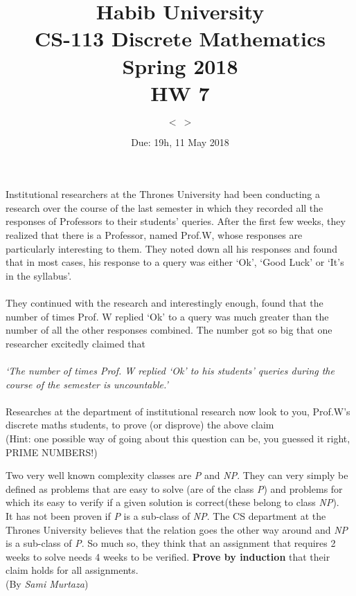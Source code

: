 \documentclass[addpoints]{exam}
\title{Habib University\\CS-113 Discrete Mathematics\\Spring 2018\\HW 7}
\author{$< \ >$}  %
\date{Due: 19h, 11 May 2018}
\begin{document}
\maketitle
\begin{questions}



\question
Institutional researchers at the Thrones University had been conducting a research over the course of the last semester in which they recorded all the responses of Professors to their students' queries. After the first few weeks, they realized that there is a Professor, named Prof.W, whose responses are particularly interesting to them. They noted down all his responses and found that in most cases, his response to a query was either `Ok', `Good Luck' or `It's in the syllabus'. \\ \\
They continued with the research and interestingly enough, found that the number of times Prof. W replied `Ok' to a query was much greater than the number of all the other responses combined. The number got so big that one researcher excitedly claimed that \\ \\ \textit{`The number of times Prof. W replied `Ok' to his students' queries during the course of the semester is uncountable.'} \\ \\
Researches at the department of institutional research now look to you, Prof.W's discrete maths students, to prove (or disprove) the above claim \\
(Hint: one possible way of going about this question can be, you guessed it right, PRIME NUMBERS!)
  \begin{solution}
  \end{solution}


\question  
Two very well known complexity classes are \textit{P} and \textit{NP}. They can very simply be defined as problems that are easy to solve (are of the class \textit{P}) and problems for which its easy to verify if a given solution is correct(these belong to class \textit{NP}).\\
It has not been proven if \textit{P} is a sub-class of \textit{NP}. The CS department at the Thrones University believes that the relation goes the other way around and \textit{NP} is a sub-class of \textit{P}. So much so, they think that an assignment that requires 2 weeks to solve needs 4 weeks to be verified. \textbf{Prove by induction} that their claim holds for all assignments. \\
(By \textit{Sami Murtaza})


\end{questions}
\end{document}
